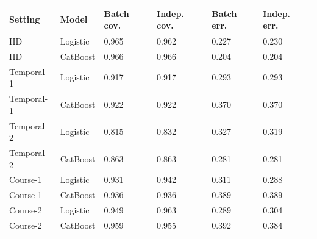 \begin{tabular}{llllll}
\toprule
Setting & Model & Batch cov. & Indep. cov. & Batch err. & Indep. err.\\
\midrule
IID & Logistic & 0.965 & 0.962 & 0.227 & 0.230\\
IID & CatBoost & 0.966 & 0.966 & 0.204 & 0.204\\
Temporal-1 & Logistic & 0.917 & 0.917 & 0.293 & 0.293\\
Temporal-1 & CatBoost & 0.922 & 0.922 & 0.370 & 0.370\\
Temporal-2 & Logistic & 0.815 & 0.832 & 0.327 & 0.319\\
Temporal-2 & CatBoost & 0.863 & 0.863 & 0.281 & 0.281\\
Course-1 & Logistic & 0.931 & 0.942 & 0.311 & 0.288\\
Course-1 & CatBoost & 0.936 & 0.936 & 0.389 & 0.389\\
Course-2 & Logistic & 0.949 & 0.963 & 0.289 & 0.304\\
Course-2 & CatBoost & 0.959 & 0.955 & 0.392 & 0.384\\
\bottomrule
\end{tabular}